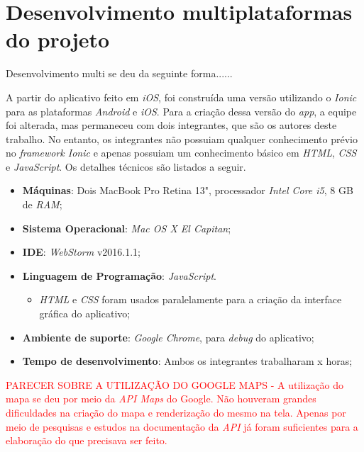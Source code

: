 \section{Desenvolvimento multiplataformas do projeto} \label{sec:desenvolvimentomulti}

Desenvolvimento multi se deu da seguinte forma......

A partir do aplicativo feito em \textit{iOS}, foi construída uma versão utilizando o \textit{Ionic} para as plataformas \textit{Android} e \textit{iOS}.
Para a criação dessa versão do \textit{app}, a equipe foi alterada, mas permaneceu com dois integrantes, que são os autores deste trabalho.
No entanto, os integrantes não possuiam qualquer conhecimento prévio no \textit{framework Ionic}
e apenas possuiam um conhecimento básico em \textit{HTML}, \textit{CSS} e \textit{JavaScript}. Os detalhes técnicos são listados a seguir.
   
\begin{itemize}
    \item \textbf{Máquinas}: Dois MacBook Pro Retina 13", processador \textit{Intel Core i5}, 8 GB de \textit{RAM};
    \item \textbf{Sistema Operacional}: \textit{Mac OS X El Capitan};
    \item \textbf{IDE}: \textit{WebStorm} v2016.1.1;
    \item \textbf{Linguagem de Programação}: \textit{JavaScript}. 
    \begin{itemize}
        \item \textit{HTML} e \textit{CSS} foram usados paralelamente para a criação da interface gráfica do aplicativo;
    \end{itemize}
    \item \textbf{Ambiente de suporte}: \textit{Google Chrome}, para \textit{debug} do aplicativo;
    \item \textbf{Tempo de desenvolvimento}: Ambos os integrantes trabalharam x horas;
\end{itemize}

\begin{comment}
será que aqui fala das versoes do ios, ionic, cordova, angularjs? sim e explicar pq nao escolheu a versao 2 do ionic, pq eh recente e estavel
\end{comment}

\textcolor{red}{PARECER SOBRE A UTILIZAÇÃO DO GOOGLE MAPS - A utilização do mapa se deu por meio da \textit{API Maps} do Google. Não houveram grandes dificuldades na criação do mapa e renderização do mesmo na tela. Apenas por meio de pesquisas e estudos na documentação
da \textit{API} já foram suficientes para a elaboração do que precisava ser feito. }

